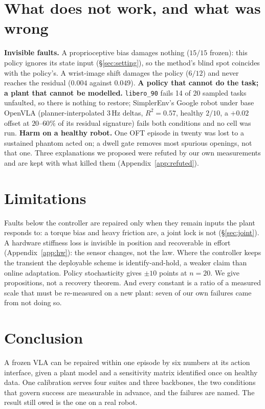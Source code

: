 \documentclass{article}
\newcommand{\code}[1]{\texttt{\small #1}}
\begin{document}
\section{What does not work, and what was wrong}
\label{sec:fail}

\textbf{Invisible faults.} A proprioceptive bias damages nothing ($15/15$ frozen): this policy
ignores its state input (\S\ref{sec:setting}), so the method's blind spot coincides with the
policy's. A wrist-image shift damages the policy ($6/12$) and never reaches the residual
($0.004$ against $0.049$). \textbf{A policy that cannot do the task; a plant that cannot be
modelled.} \code{libero\_90} fails 14 of 20 sampled tasks unfaulted, so there is nothing to
restore; SimplerEnv's Google robot under base OpenVLA (planner-interpolated 3\,Hz deltas,
$R^2=0.57$, healthy $2/10$, a $+0.02$ offset at $20$--$60\%$ of its residual signature) fails
both conditions and no cell was run. \textbf{Harm on a healthy robot.} One OFT episode in
twenty was lost to a sustained phantom acted on; a dwell gate removes most spurious openings,
not that one. Three explanations we proposed were refuted by our own measurements and are kept
with what killed them (Appendix~\ref{app:refuted}).

\section{Limitations}
\label{sec:limits}

Faults below the controller are repaired only when they remain inputs the plant responds to:
a torque bias and heavy friction are, a joint lock is not (\S\ref{sec:joint}). A hardware
stiffness loss is invisible in position and recoverable in effort (Appendix~\ref{app:hw}): the
sensor changes, not the law. Where the controller keeps the transient the deployable scheme is
identify-and-hold, a weaker claim than online adaptation. Policy stochasticity gives $\pm10$
points at $n=20$. We give propositions, not a recovery theorem. And every constant is a ratio
of a measured scale that must be re-measured on a new plant: seven of our own failures came
from not doing so.

\section{Conclusion}


A frozen VLA can be repaired within one episode by six numbers at its action interface, given
a plant model and a sensitivity matrix identified once on healthy data. One calibration serves
four suites and three backbones, the two conditions that govern success are measurable in
advance, and the failures are named. The result still owed is the one on a real robot.
\end{document}
